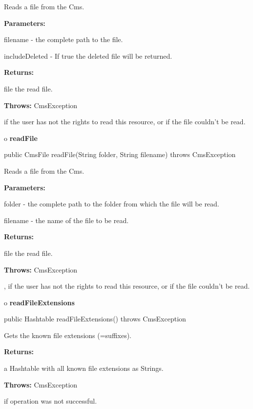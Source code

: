 \begin{description}
\htmlDD Reads a file from the Cms. 

\begin{description}
\item {\bf Parameters:}  

filename - the complete path to the file.  

includeDeleted - If true the deleted file will be returned.  
\item {\bf Returns:}  

file the read file.  
\item {\bf Throws:} CmsException  

if the user has not the rights to read this resource, or if the file couldn't
be read.  
\end{description}

\end{description}

o {\bf readFile} 

\begin{PRE}
 public CmsFile readFile(String folder,
                         String filename) throws CmsException
\end{PRE}

\begin{description}
\htmlDD Reads a file from the Cms. 

\begin{description}
\item {\bf Parameters:}  

folder - the complete path to the folder from which the file will be read.  

filename - the name of the file to be read.  
\item {\bf Returns:}  

file the read file.  
\item {\bf Throws:} CmsException  

, if the user has not the rights to read this resource, or if the file
couldn't be read.  
\end{description}

\end{description}

o {\bf readFileExtensions} 

\begin{PRE}
 public Hashtable readFileExtensions() throws CmsException
\end{PRE}

\begin{description}
\htmlDD Gets the known file extensions (=suffixes). 

\begin{description}
\item {\bf Returns:}  

a Hashtable with all known file extensions as Strings.  
\item {\bf Throws:} CmsException  

if operation was not successful.  
\end{description}

\end{description}

